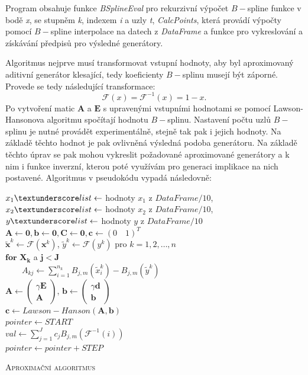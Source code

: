 Program obsahuje funkce \textit{BSplineEval} pro rekurzivní výpočet $B-$spline funkce v bodě \textit{x}, se stupněm \textit{k}, indexem \textit{i} a uzly \textit{t}, \textit{CalcPoints}, která provádí výpočty pomocí $B-$spline interpolace na datech z \textit{DataFrame} a funkce pro vykreslování a získávání předpis\r u pro výsledné generátory.

Algoritmus nejprve musí transformovat vstupní hodnoty, aby byl aproximovaný aditivní generátor klesající, tedy koeficienty $B-$splinu musejí být záporné. Provede se tedy následující transformace: $$
  \mathcal{F}(x) = \mathcal{F}^{-1}(x) = 1-x.
$$
Po vytvoření matic $\mathbf{A}$ a $\mathbf{E}$ s upravenými vstupními hodnotami se pomocí Lawson-Hansonova algoritmu spočítají hodnotu $B-$splinu. Nastavení počtu uzl\r u $B-$splinu je nutné provádět experimentálně, stejně tak pak i jejich hodnoty. Na základě těchto hodnot je pak ovlivněná výsledná podoba generátoru. Na základě těchto \' uprav se pak mohou vykreslit požadované aproximované generátory a k nim i funkce inverzní, kterou poté využívám pro generaci implikace na nich postavené. Algoritmus v pseudok\'odu vypadá následovně:

\begin{algorithm}[H]
 \SetNlSty{}{}{:}
 \SetNlSkip{-1.2em}
 \SetInd{1em}{1em}
 \BlankLine
 \Indentp{1.7em}
    $x_1\textunderscore list \gets$ hodnoty $x_1$ z $\textit{DataFrame} / 10$, $x_2\textunderscore list \gets$ hodnoty $x_2$ z $\textit{DataFrame} / 10$, $y\textunderscore list \gets$ hodnoty $y$ z $\textit{DataFrame} / 10$\\
    $\mathbf{A} \gets \mathbf{0}, \mathbf{b} \gets \mathbf{0}, \mathbf{C} \gets \mathbf{0}, \mathbf{c} \gets (0\quad1)^T$\\
    $\widetilde{\mathbf{x}}^k \gets \mathcal{F}(\mathbf{x}^k)$, $\widetilde{y}^k \gets \mathcal{F}(y^k)$ pro $k = 1,2,\dots,n$\\
    $\textbf{for } \mathbf{ X_k}$ a $\mathbf{j < J}$\\
    $\qquad A_{kj} \gets \sum_{i = 1}^{n_k}B_{j,m}(\widetilde{x}_i^k) - B_{j,m}(\widetilde{y}^k)$ \\
    $\mathbf{A} \gets \begin{pmatrix} \gamma\mathbf{E} \\ \mathbf{A} \end{pmatrix}$, 
      $\mathbf{b} \gets \begin{pmatrix} \gamma\mathbf{d} \\ \mathbf{b} \end{pmatrix}$\\
    $\mathbf{c} \gets Lawson-Hanson(\mathbf{A}, \mathbf{b})$ \\
    $pointer \gets START$\\
     {
    {
	$val \gets \sum_{j = 1}^Jc_jB_{j,m}(\mathcal{F}^{-1}(i))$\\
	
      }
      $pointer \gets pointer + STEP$
    }
 \caption{\textsc{Aproximační algoritmus}}
\end{algorithm}

